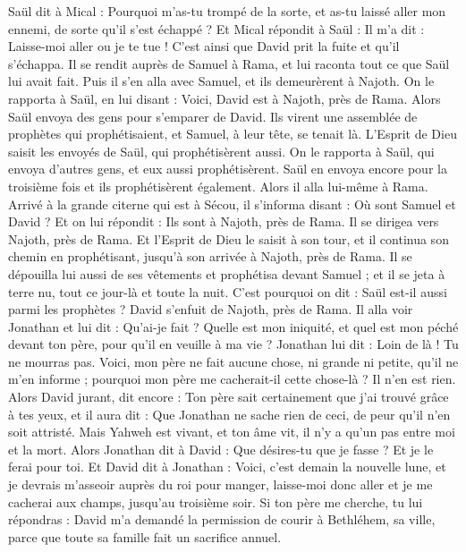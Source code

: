 \begin{multicols}{2}
Saül dit à Mical : Pourquoi m'as-tu trompé de la sorte, et as-tu laissé aller mon ennemi, de sorte qu'il s'est échappé ? Et Mical répondit à Saül : Il m'a dit : Laisse-moi aller ou je te tue !
C'est ainsi que David prit la fuite et qu'il s'échappa. Il se rendit auprès de Samuel à Rama, et lui raconta tout ce que Saül lui avait fait. Puis il s'en alla avec Samuel, et ils demeurèrent à Najoth.
On le rapporta à Saül, en lui disant : Voici, David est à Najoth, près de Rama.
Alors Saül envoya des gens pour s'emparer de David. Ils virent une assemblée de prophètes qui prophétisaient, et Samuel, à leur tête, se tenait là. L'Esprit de Dieu saisit les envoyés de Saül, qui prophétisèrent aussi.
On le rapporta à Saül, qui envoya d'autres gens, et eux aussi prophétisèrent. Saül en envoya encore pour la troisième fois et ils prophétisèrent également.
Alors il alla lui-même à Rama. Arrivé à la grande citerne qui est à Sécou, il s'informa disant : Où sont Samuel et David ? Et on lui répondit : Ils sont à Najoth, près de Rama.
Il se dirigea vers Najoth, près de Rama. Et l'Esprit de Dieu le saisit à son tour, et il continua son chemin en prophétisant, jusqu'à son arrivée à Najoth, près de Rama.
Il se dépouilla lui aussi de ses vêtements et prophétisa devant Samuel ; et il se jeta à terre nu, tout ce jour-là et toute la nuit. C'est pourquoi on dit : Saül est-il aussi parmi les prophètes ?
\VerseOne{}David s'enfuit de Najoth, près de Rama. Il alla voir Jonathan et lui dit : Qu'ai-je fait ? Quelle est mon iniquité, et quel est mon péché devant ton père, pour qu'il en veuille à ma vie ?
Jonathan lui dit : Loin de là ! Tu ne mourras pas. Voici, mon père ne fait aucune chose, ni grande ni petite, qu'il ne m'en informe ; pourquoi mon père me cacherait-il cette chose-là ? Il n'en est rien.
Alors David jurant, dit encore : Ton père sait certainement que j'ai trouvé grâce à tes yeux, et il aura dit : Que Jonathan ne sache rien de ceci, de peur qu'il n'en soit attristé. Mais Yahweh est vivant, et ton âme vit, il n'y a qu'un pas entre moi et la mort.
Alors Jonathan dit à David : Que désires-tu que je fasse ? Et je le ferai pour toi.
Et David dit à Jonathan : Voici, c'est demain la nouvelle lune, et je devrais m'asseoir auprès du roi pour manger, laisse-moi donc aller et je me cacherai aux champs, jusqu'au troisième soir.
Si ton père me cherche, tu lui répondras : David m'a demandé la permission de courir à Bethléhem, sa ville, parce que toute sa famille fait un sacrifice annuel.

\end{multicols}
